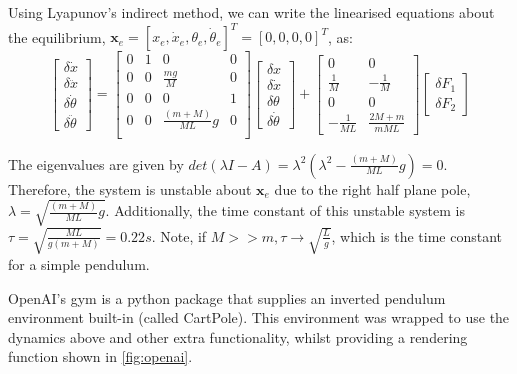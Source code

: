\documentclass[../main.tex]{subfiles}
\begin{document}
Using Lyapunov's indirect method, we can write the linearised equations about the equilibrium, $\boldsymbol{x}_e = [x_e, \dot{x}_e, \theta_e, \dot{\theta}_e]^T = [0, 0, 0, 0]^T$, as:
\begin{equation}
   \newcommand{\pf}[2]{\frac{\partial f_#1}{\partial #2}\big{|}_{\boldsymbol{x}_e}}
\begin{bmatrix} \delta \dot{x} \\ \delta \ddot{x} \\ \delta \dot{\theta} \\ \delta \ddot{\theta} \end{bmatrix} 
=   \begin{bmatrix} 
   0 & 1 & 0 & 0 \\
   0 & 0 & \frac{mg}{M} & 0 \\
   0 & 0 & 0 & 1 \\
   0 & 0 & \frac{(m+M)}{ML}g & 0 \\
   \end{bmatrix}
   \begin{bmatrix} \delta x \\ \delta \dot{x} \\ \delta \theta \\ \delta \dot{\theta} \end{bmatrix}
+  \begin{bmatrix} 0 & 0 \\ \frac{1}{M} & -\frac{1}{M} \\ 0 & 0 \\ -\frac{1}{ML} & \frac{2M+m}{mML} \end{bmatrix} 
\begin{bmatrix} \delta F_1 \\ \delta F_2 \end{bmatrix}
\end{equation}

The eigenvalues are given by $det(\lambda I - A) = \lambda^2 (\lambda^2 - \frac{(m+M)}{ML}g) = 0$. Therefore, the system is unstable about $\boldsymbol{x}_e$ due to the right half plane pole, $\lambda = \sqrt{\frac{(m+M)}{ML}g}$. Additionally, the time constant of this unstable system is $\tau = \sqrt{\frac{ML}{g(m+M)}} = 0.22s$. Note, if $M >> m, \tau \rightarrow \sqrt{\frac{L}{g}}$, which is the time constant for a simple pendulum.

OpenAI's gym is a python package that supplies an inverted pendulum environment built-in (called CartPole). This environment was wrapped to use the dynamics above and other extra functionality, whilst providing a rendering function shown in \cref{fig:openai}.
\end{document}
